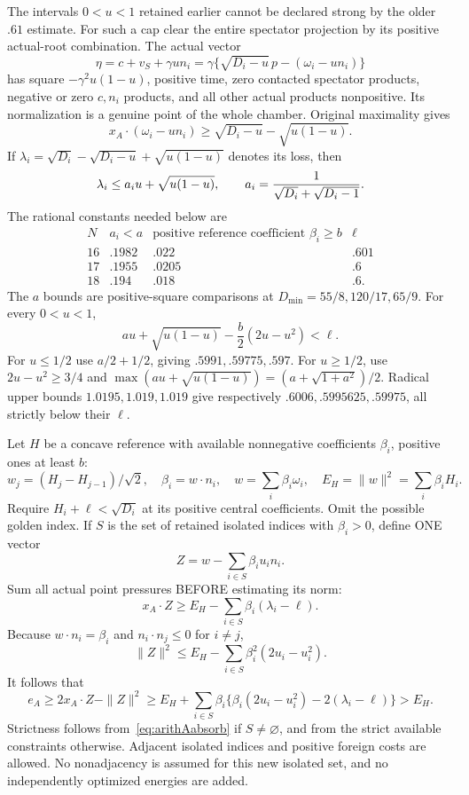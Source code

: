 \documentclass[11pt]{article}
\begin{document}
The intervals \(0<u<1\) retained earlier cannot be declared
strong by the older \(.61\) estimate.
For such a cap clear the entire spectator projection by its
positive actual-root combination.  The actual vector
\[
 \eta=c+v_S+\gamma u n_i
      =\gamma\{\sqrt{D_i-u}\,p-(\omega_i-un_i)\}
\]
has square \(-\gamma^2u(1-u)\), positive time, zero contacted
spectator products, negative or zero \(c,n_i\) products, and
all other actual products nonpositive.
Its normalization is a genuine point of the whole chamber.
Original maximality gives
\[
 x_A\cdot(\omega_i-un_i)
 \ge\sqrt{D_i-u}-\sqrt{u(1-u)}.
\]
If \(\lambda_i=\sqrt{D_i}-\sqrt{D_i-u}+\sqrt{u(1-u)}\)
denotes its loss, then
\[
 \lambda_i\le a_i u+\sqrt{u(1-u)},\qquad
 a_i={1\over\sqrt{D_i}+\sqrt{D_i-1}}.
\]
The rational constants needed below are
\[
\begin{array}{c|ccc}
N&a_i<a&\text{positive reference coefficient }\beta_i\ge b&
 \ell\\ \hline
16&.1982&.022&.601\\
17&.1955&.0205&.6\\
18&.194&.018&.6 .
\end{array}
\]
The \(a\) bounds are positive-square comparisons at
\(D_{\min}=55/8,120/17,65/9\).
For every \(0<u<1\),
\[
 a u+\sqrt{u(1-u)}-\frac b2(2u-u^2)<\ell.
\tag{Aabsorb}\label{eq:arithAabsorb}
\]
For \(u\le1/2\) use \(a/2+1/2\), giving
\(.5991,.59775,.597\).
For \(u\ge1/2\), use \(2u-u^2\ge3/4\) and
\(\max(au+\sqrt{u(1-u)})=(a+\sqrt{1+a^2})/2\).
Radical upper bounds \(1.0195,1.019,1.019\) give respectively
\(.6006,.5995625,.59975\), all strictly below their \(\ell\).

Let \(H\) be a concave reference with available nonnegative
coefficients \(\beta_i\), positive ones at least \(b\):
\[
 w_j=(H_j-H_{j-1})/\sqrt2,\quad
 \beta_i=w\cdot n_i,\quad
 w=\sum_i\beta_i\omega_i,\quad
 E_H=\|w\|^2=\sum_i\beta_iH_i .
\]
Require \(H_i+\ell<\sqrt{D_i}\) at its positive central
coefficients.  Omit the possible golden index.
If \(S\) is the set of retained isolated indices with
\(\beta_i>0\), define ONE vector
\[
                       Z=w-\sum_{i\in S}\beta_i u_i n_i .
\]
Sum all actual point pressures BEFORE estimating its norm:
\[
 x_A\cdot Z\ge E_H-\sum_{i\in S}\beta_i(\lambda_i-\ell).
\]
Because \(w\cdot n_i=\beta_i\) and
\(n_i\cdot n_j\le0\) for \(i\ne j\),
\[
 \|Z\|^2\le E_H-\sum_{i\in S}\beta_i^2(2u_i-u_i^2).
\]
It follows that
\[
 e_A\ge2x_A\cdot Z-\|Z\|^2
 \ge E_H+\sum_{i\in S}\beta_i
       \{\beta_i(2u_i-u_i^2)-2(\lambda_i-\ell)\}>E_H.
\tag{Asummed}\label{eq:arithAsummed}
\]
Strictness follows from~\eqref{eq:arithAabsorb} if \(S\ne\varnothing\),
and from the strict available constraints otherwise.
Adjacent isolated indices and positive foreign costs are allowed.
No nonadjacency is assumed for this new isolated set, and no
independently optimized energies are added.
\end{document}

